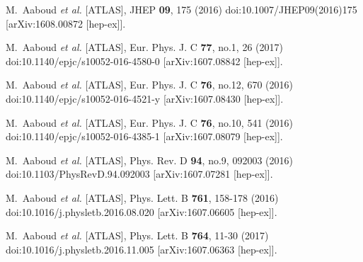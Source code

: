 \begin{thebibliography}{9}
M.~Aaboud \textit{et al.} [ATLAS],
JHEP \textbf{09}, 175 (2016)
doi:10.1007/JHEP09(2016)175
[arXiv:1608.00872 [hep-ex]].

M.~Aaboud \textit{et al.} [ATLAS],
Eur. Phys. J. C \textbf{77}, no.1, 26 (2017)
doi:10.1140/epjc/s10052-016-4580-0
[arXiv:1607.08842 [hep-ex]].

M.~Aaboud \textit{et al.} [ATLAS],
Eur. Phys. J. C \textbf{76}, no.12, 670 (2016)
doi:10.1140/epjc/s10052-016-4521-y
[arXiv:1607.08430 [hep-ex]].

M.~Aaboud \textit{et al.} [ATLAS],
Eur. Phys. J. C \textbf{76}, no.10, 541 (2016)
doi:10.1140/epjc/s10052-016-4385-1
[arXiv:1607.08079 [hep-ex]].

M.~Aaboud \textit{et al.} [ATLAS],
Phys. Rev. D \textbf{94}, no.9, 092003 (2016)
doi:10.1103/PhysRevD.94.092003
[arXiv:1607.07281 [hep-ex]].

M.~Aaboud \textit{et al.} [ATLAS],
Phys. Lett. B \textbf{761}, 158-178 (2016)
doi:10.1016/j.physletb.2016.08.020
[arXiv:1607.06605 [hep-ex]].

M.~Aaboud \textit{et al.} [ATLAS],
Phys. Lett. B \textbf{764}, 11-30 (2017)
doi:10.1016/j.physletb.2016.11.005
[arXiv:1607.06363 [hep-ex]].


\end{thebibliography}
